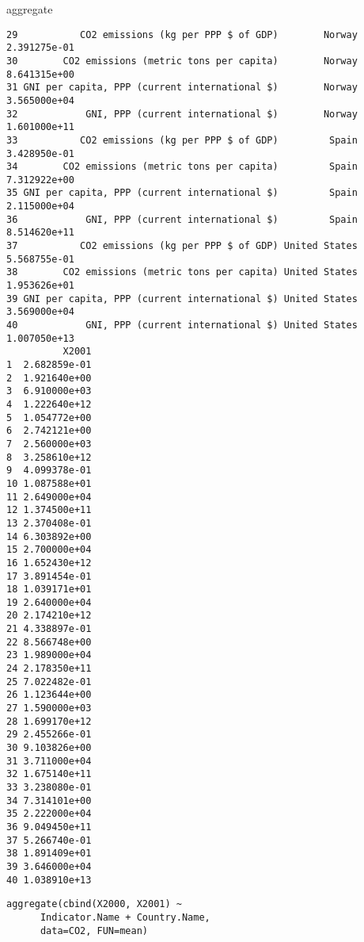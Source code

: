 \documentclass[xcolor={usenames,svgnames,dvipsnames}]{beamer}
\begin{document}
\begin{frame}[fragile,label=sec-3-7]{aggregate}
\begin{verbatim}
29           CO2 emissions (kg per PPP $ of GDP)        Norway 2.391275e-01
30        CO2 emissions (metric tons per capita)        Norway 8.641315e+00
31 GNI per capita, PPP (current international $)        Norway 3.565000e+04
32            GNI, PPP (current international $)        Norway 1.601000e+11
33           CO2 emissions (kg per PPP $ of GDP)         Spain 3.428950e-01
34        CO2 emissions (metric tons per capita)         Spain 7.312922e+00
35 GNI per capita, PPP (current international $)         Spain 2.115000e+04
36            GNI, PPP (current international $)         Spain 8.514620e+11
37           CO2 emissions (kg per PPP $ of GDP) United States 5.568755e-01
38        CO2 emissions (metric tons per capita) United States 1.953626e+01
39 GNI per capita, PPP (current international $) United States 3.569000e+04
40            GNI, PPP (current international $) United States 1.007050e+13
          X2001
1  2.682859e-01
2  1.921640e+00
3  6.910000e+03
4  1.222640e+12
5  1.054772e+00
6  2.742121e+00
7  2.560000e+03
8  3.258610e+12
9  4.099378e-01
10 1.087588e+01
11 2.649000e+04
12 1.374500e+11
13 2.370408e-01
14 6.303892e+00
15 2.700000e+04
16 1.652430e+12
17 3.891454e-01
18 1.039171e+01
19 2.640000e+04
20 2.174210e+12
21 4.338897e-01
22 8.566748e+00
23 1.989000e+04
24 2.178350e+11
25 7.022482e-01
26 1.123644e+00
27 1.590000e+03
28 1.699170e+12
29 2.455266e-01
30 9.103826e+00
31 3.711000e+04
32 1.675140e+11
33 3.238080e-01
34 7.314101e+00
35 2.222000e+04
36 9.049450e+11
37 5.266740e-01
38 1.891409e+01
39 3.646000e+04
40 1.038910e+13
\end{verbatim}

\lstset{language=R,numbers=none}
\begin{lstlisting}
aggregate(cbind(X2000, X2001) ~
	  Indicator.Name + Country.Name,
	  data=CO2, FUN=mean)
\end{lstlisting}


\end{frame}
\end{document}
